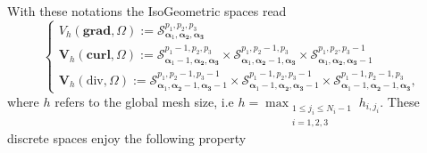 With these notations the IsoGeometric spaces read \cite{buffa2011isogeometric,da2014mathematical}
\begin{equation}\label{eq:IsoGeometric-spaces}
\begin{cases}
V_h(\textbf{grad},\Omega):=\bm{\mathcal{S}}^{p_1,p_2,p_3}_{\bm{\alpha}_1,\bm{\alpha_2},\bm{\alpha_3}}\\
\bm{V}_h(\textbf{curl},\Omega):=\bm{\mathcal{S}}^{p_1-1,p_2,p_3}_{\bm{\alpha}_1-1,\bm{\alpha_2},\bm{\alpha_3}} \times \bm{\mathcal{S}}^{p_1,p_2-1,p_3}_{\bm{\alpha}_1,\bm{\alpha_2}-1,\bm{\alpha_3}} \times \bm{\mathcal{S}}^{p_1,p_2,p_3-1}_{\bm{\alpha}_1,\bm{\alpha_2},\bm{\alpha_3}-1}\\
\bm{V}_h(\text{div},\Omega):=\bm{\mathcal{S}}^{p_1,p_2-1,p_3-1}_{\bm{\alpha}_1,\bm{\alpha_2}-1,\bm{\alpha_3}-1} \times \bm{\mathcal{S}}^{p_1-1,p_2,p_3-1}_{\bm{\alpha}_1-1,\bm{\alpha_2},\bm{\alpha_3}-1} \times \bm{\mathcal{S}}^{p_1-1,p_2-1,p_3}_{\bm{\alpha}_1-1,\bm{\alpha_2}-1,\bm{\alpha_3}},
\end{cases}
\end{equation}
where $h$ refers to the global mesh size, i.e $h=\max_{\substack{1 \leq j_i \leq N_i-1 \\ i=1,2,3}}h_{i,j_i}$. These discrete spaces enjoy the following property 
%
